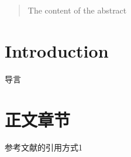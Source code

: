 \documentclass[10pt, oneside, AutoFakeBold, a4paper]{article}      %
\newcommand{\upcite}[1]{\hspace{0ex}\textsuperscript{\cite{#1}}} %
\begin{document}
\maketitle

\begin{abstract}
The content of the abstract
\end{abstract}


\tableofcontents %

\newpage	        %
\thispagestyle{fancy}   %

\section{Introduction}
导言
\section{正文章节}
参考文献的引用方式1\upcite{QCQC_2014}
\end{document}
